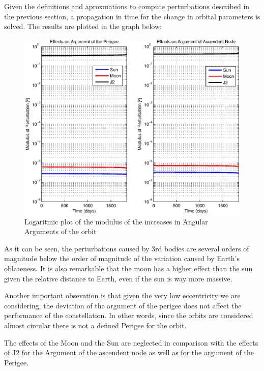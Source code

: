 Given the definitions and aproxmations to compute perturbations described in the previous section, a propagation in time for the change in orbital parameters is solved. The results are plotted in the graph below:

\begin{figure}[H]
\centering
\includegraphics[scale=0.8]{SignificativePerturbations/ModulusAngulars.eps}
\caption{Logaritmic plot of the modulus of the increases in Angular Arguments of the orbit}
\end{figure}

As it can be seen, the perturbations caused by 3rd bodies are several orders of magnitude below the order of magnitude of the variation caused by Earth's oblateness. It is also remarkable that the moon has a higher effect than the sun given the relative distance to Earth, even if the sun is way more massive.

Another important obsevation is that given the very low eccentricity we are considering, the deviation of the argument of the perigee does not affect the performance of the constellation. In other words, since the orbits are considered almost circular there is not a defined Perigee for the orbit.

The effects of the Moon and the Sun are neglected in comparison with the effects of J2 for the Argument of the ascendent node as well as for the argument of the Perigee.